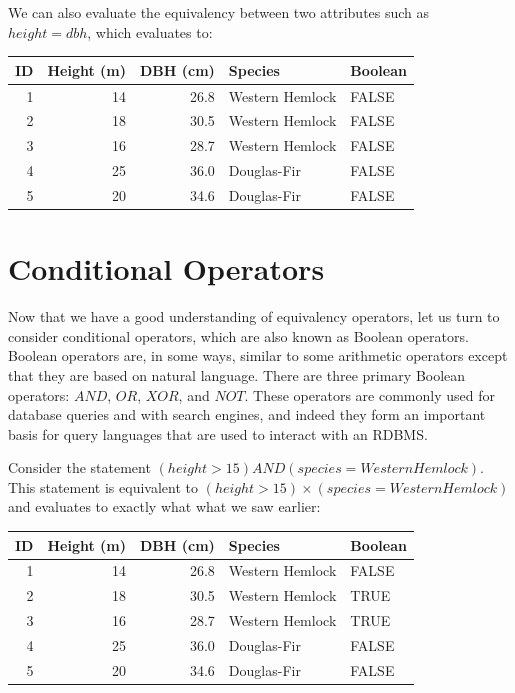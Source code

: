 \documentclass[
]{book}
\begin{document}
We can also evaluate the equivalency between two attributes such as \(height=dbh\), which evaluates to:

\begin{tabular}{rrrll}
\toprule
ID & Height (m) & DBH (cm) & Species & Boolean\\
\midrule
1 & 14 & 26.8 & Western Hemlock & FALSE\\
2 & 18 & 30.5 & Western Hemlock & FALSE\\
3 & 16 & 28.7 & Western Hemlock & FALSE\\
4 & 25 & 36.0 & Douglas-Fir & FALSE\\
5 & 20 & 34.6 & Douglas-Fir & FALSE\\
\bottomrule
\end{tabular}

\hypertarget{conditional-operators}{%
\section{Conditional Operators}\label{conditional-operators}}

Now that we have a good understanding of equivalency operators, let us turn to consider conditional operators, which are also known as Boolean operators. Boolean operators are, in some ways, similar to some arithmetic operators except that they are based on natural language. There are three primary Boolean operators: \(AND\), \(OR\), \(XOR\), and \(NOT\). These operators are commonly used for database queries and with search engines, and indeed they form an important basis for query languages that are used to interact with an RDBMS.

Consider the statement \((height>15)AND(species=WesternHemlock)\). This statement is equivalent to \((height>15)×(species=WesternHemlock)\) and evaluates to exactly what what we saw earlier:

\begin{tabular}{rrrll}
\toprule
ID & Height (m) & DBH (cm) & Species & Boolean\\
\midrule
1 & 14 & 26.8 & Western Hemlock & FALSE\\
2 & 18 & 30.5 & Western Hemlock & TRUE\\
3 & 16 & 28.7 & Western Hemlock & TRUE\\
4 & 25 & 36.0 & Douglas-Fir & FALSE\\
5 & 20 & 34.6 & Douglas-Fir & FALSE\\
\bottomrule
\end{tabular}
\end{document}
